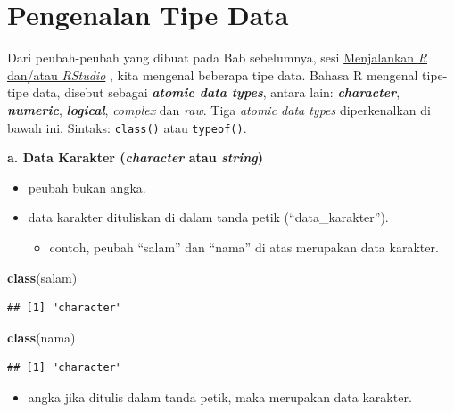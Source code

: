 \documentclass[
  12pt,
  a4paper,
]{scrbook}
\newenvironment{Shaded}{\begin{snugshade}}{\end{snugshade}}
\newcommand{\KeywordTok}[1]{\textcolor[rgb]{0.13,0.29,0.53}{\textbf{#1}}}
\newcommand{\NormalTok}[1]{#1}
\providecommand{\tightlist}{%
  \setlength{\itemsep}{0pt}\setlength{\parskip}{0pt}}
\begin{document}
\hypertarget{tipedata}{%
\section{Pengenalan Tipe Data}\label{tipedata}}

Dari peubah-peubah yang dibuat pada Bab sebelumnya, sesi
\protect\hyperlink{jalankanr}{Menjalankan \emph{R} dan/atau
\emph{RStudio}} , kita mengenal beberapa tipe data. Bahasa R mengenal
tipe-tipe data, disebut sebagai \textbf{\emph{atomic data types}},
antara lain: \textbf{\emph{character}}, \textbf{\emph{numeric}},
\textbf{\emph{logical}}, \emph{complex} dan \emph{raw}. Tiga
\emph{atomic data types} diperkenalkan di bawah ini. Sintaks:
\texttt{class()} atau \texttt{typeof()}.

\textbf{a. Data Karakter (\emph{character} atau \emph{string})}

\begin{itemize}
\tightlist
\item
  peubah bukan angka.
\item
  data karakter dituliskan di dalam tanda petik (``data\_karakter'').

  \begin{itemize}
  \tightlist
  \item
    contoh, peubah ``salam'' dan ``nama'' di atas merupakan data
    karakter.
  \end{itemize}
\end{itemize}

\begin{Shaded}
\begin{Highlighting}[]
\KeywordTok{class}\NormalTok{(salam)}
\end{Highlighting}
\end{Shaded}

\begin{verbatim}
## [1] "character"
\end{verbatim}

\begin{Shaded}
\begin{Highlighting}[]
\KeywordTok{class}\NormalTok{(nama)}
\end{Highlighting}
\end{Shaded}

\begin{verbatim}
## [1] "character"
\end{verbatim}

\begin{itemize}
\tightlist
\item
  angka jika ditulis dalam tanda petik, maka merupakan data karakter.
\end{itemize}
\end{document}
